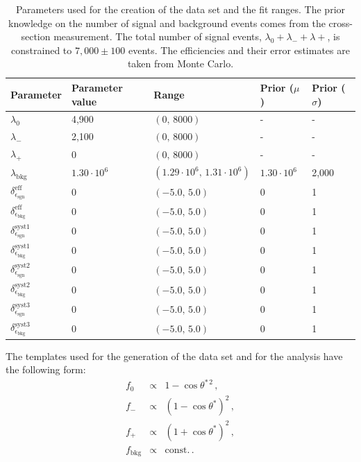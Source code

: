\documentclass[11pt, a4paper]{article}
\begin{document}
\begin{table}
\begin{center}
\caption{Parameters used for the creation of the data set and the
fit ranges. The prior knowledge on the number of signal and background
events comes from the cross-section measurement. The total number of
signal events, $\lambda_{0}+\lambda_{-}+\lambda{+}$, is constrained to
$7,000\pm100$ events. The efficiencies and their error estimates are
taken from Monte Carlo.}
\begin{tabular}{lllll}
\hline
Parameter                 & Parameter value       & Range              & Prior ($\mu$) & Prior ($\sigma$) \\ 
\hline
$\lambda_{0}$             & 4,900                 & $(0,\,8000)$       & - & - \\ 
$\lambda_{-}$             & 2,100                 & $(0,\,8000)$       & - & - \\ 
$\lambda_{+}$             & 0                     & $(0,\,8000)$       & - & - \\ 
$\lambda_{\mathrm{bkg}}$  & $1.30\cdot 10^{6}$    & $(1.29\cdot 10^{6},\, 1.31\cdot 10^{6})$ &  $1.30\cdot10^{6}$ & 2,000 \\ 
\hline
$\delta_{\epsilon_{\mathrm{sgn}}}^{\mathrm{eff}}$    & 0 & $(-5.0,\, 5.0)$ & 0 & 1 \\ 
$\delta_{\epsilon_{\mathrm{bkg}}}^{\mathrm{eff}}$    & 0 & $(-5.0,\, 5.0)$ & 0 & 1 \\ 
$\delta_{\epsilon_{\mathrm{sgn}}}^{\mathrm{syst 1}}$ & 0 & $(-5.0,\, 5.0)$ & 0 & 1 \\ 
$\delta_{\epsilon_{\mathrm{bkg}}}^{\mathrm{syst 1}}$ & 0 & $(-5.0,\, 5.0)$ & 0 & 1 \\ 
$\delta_{\epsilon_{\mathrm{sgn}}}^{\mathrm{syst 2}}$ & 0 & $(-5.0,\, 5.0)$ & 0 & 1 \\ 
$\delta_{\epsilon_{\mathrm{bkg}}}^{\mathrm{syst 2}}$ & 0 & $(-5.0,\, 5.0)$ & 0 & 1 \\ 
$\delta_{\epsilon_{\mathrm{sgn}}}^{\mathrm{syst 3}}$ & 0 & $(-5.0,\, 5.0)$ & 0 & 1 \\ 
$\delta_{\epsilon_{\mathrm{bkg}}}^{\mathrm{syst 3}}$ & 0 & $(-5.0,\, 5.0)$ & 0 & 1 \\ 
\hline
\end{tabular}
\end{center}
\label{tab:example}
\end{table}

The templates used for the generation of the data set and for the
analysis have the following form:
%
\begin{eqnarray*}
f_{0} & \propto & 1 - \cos \theta^{*\, 2} \, , \\
f_{-} & \propto & (1 - \cos \theta^{*})^{2} \, , \\
f_{+} & \propto & (1 + \cos \theta^{*})^{2} \, , \\
f_{\mathrm{bkg}} & \propto & \mathrm{const.} \, .
\end{eqnarray*}
\end{document}
